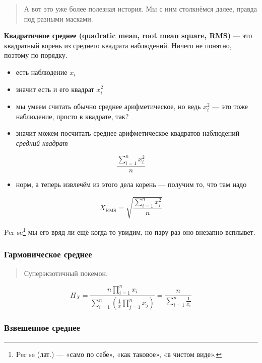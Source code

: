 \documentclass[
  letterpaper,
  DIV=11,
  numbers=noendperiod]{scrreprt}
\providecommand{\tightlist}{%
  \setlength{\itemsep}{0pt}\setlength{\parskip}{0pt}}\usepackage{longtable,booktabs,array}
\theoremstyle{definition}
\theoremstyle{remark}
\begin{document}
\begin{quote}
А вот это уже более полезная история. Мы с ним столкнёмся далее, правда
под разными масками.
\end{quote}

\textbf{Квадратичное среднее (quadratic mean, root mean square, RMS)}
--- это квадратный корень из среднего квадрата наблюдений. Ничего не
понятно, поэтому по порядку.

\begin{itemize}
\tightlist
\item
  есть наблюдение \(x_i\)
\item
  значит есть и его квадрат \(x_i^2\)
\item
  мы умеем считать обычно среднее арифметическое, но ведь \(x_i^2\) ---
  это тоже наблюдение, просто в квадрате, так?
\item
  значит можем посчитать среднее арифметическое квадратов наблюдений ---
  \emph{средний квадрат}
\end{itemize}

\[
\frac{\sum_{i=1}^n x_i^2}{n}
\]

\begin{itemize}
\tightlist
\item
  норм, а теперь извлечём из этого дела корень --- получим то, что там
  надо
\end{itemize}

\[
X_{\mathrm{RMS}} = \sqrt{\frac{\sum_{i=1}^n x_i^2}{n}}
\]

Per se\footnote{Per se (лат.) --- «само по себе», «как таковое», «в
  чистом виде».} мы его вряд ли ещё когда-то увидим, но пару раз оно
внезапно всплывет.

\subsubsection{Гармоническое
среднее}\label{andan-descriptives-harmonic-mean}

\begin{quote}
Суперэкзотичный покемон.
\end{quote}

\[
H_X = \frac{n \prod_{i=1}^n x_i}{\sum_{i=1}^n (\tfrac{1}{x} \prod_{j=1}^n x_j)} = \frac{n}{\sum_{i=1}^n \tfrac{1}{x_i}}
\]

\subsubsection{Взвешенное
среднее}\label{andan-descriptives-weighted-mean}
\end{document}
